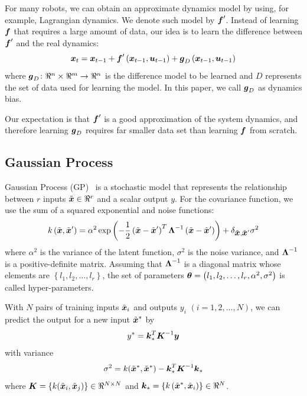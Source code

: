 For many robots, we can obtain an approximate dynamics model by using,
for example, Lagrangian dynamics.
We denote such model by $\mbox{\boldmath \(f\)}'$.
Instead of learning $\mbox{\boldmath \(f\)}$ that requires a large amount of data,
our idea is to learn the difference between $\mbox{\boldmath \(f\)}'$ and the real
dynamics:
\begin{equation}
\mbox{\boldmath \(x\)}_t = \mbox{\boldmath \(x\)}_{t-1} + \mbox{\boldmath \(f\)}'\left(\mbox{\boldmath \(x\)}_{t-1},
\mbox{\boldmath \(u\)}_{t-1}\right) +
\mbox{\boldmath \(g\)}_D\left(\mbox{\boldmath \(x\)}_{t-1},\mbox{\boldmath \(u\)}_{t-1}\right)
\end{equation}
where $\mbox{\boldmath \(g\)}_D\colon
\Re^{n}\times\Re^{m}\rightarrow\Re^{n}$ is the difference
model to be learned and $D$ 
represents the set of data used for learning the model.
In this paper, we call $\mbox{\boldmath \(g\)}_D$ as dynamics bias.

Our expectation is that $\mbox{\boldmath \(f\)}'$ is a good approximation of the system
dynamics, and therefore learning $\mbox{\boldmath \(g\)}_D$ requires far smaller
data set than learning $\mbox{\boldmath \(f\)}$ from scratch.

\subsection{Gaussian Process}


Gaussian Process (GP)~\cite{bib-rasmussen-gp} is a stochastic model that
represents the relationship between $r$ inputs
$\tilde{\mbox{\boldmath \(x\)}}\in \Re^{r}$ and a scalar output $y$.
For the covariance function, we use the sum of a squared exponential
and noise functions:
\begin{equation}
k\left(\tilde{\mbox{\boldmath \(x\)}}, \tilde{\mbox{\boldmath \(x\)}}'\right) = \alpha^2 \exp \left(
-\frac{1}{2} \left(\tilde{\mbox{\boldmath \(x\)}} - \tilde{\mbox{\boldmath \(x\)}}'\right)^T
\mbox{\boldmath \(\Lambda\)}^{-1} \left(\tilde{\mbox{\boldmath \(x\)}} - \tilde{\mbox{\boldmath \(x\)}}'\right)
\right)
+ \delta_{\tilde{\mbox{\boldmath \(x\)}}, \tilde{\mbox{\boldmath \(x\)}}'} \sigma^2
\end{equation}
where $\alpha^2$ is the variance of the latent function, $\sigma^2$ is
the noise variance, and $\mbox{\boldmath \(\Lambda\)}^{-1}$ is a positive-definite
matrix. 
Assuming that $\mbox{\boldmath \(\Lambda\)}^{-1}$ is a diagonal matrix whose
elements are $\left\{l_1, l_2, \ldots, l_r\right\}$, the set of
parameters $\mbox{\boldmath \(\theta\)} =
\left(l_1,l_2,\ldots,l_r,\alpha^2,\sigma^2\right)$ is called
hyper-parameters. 

With $N$ pairs of training inputs $\tilde{\mbox{\boldmath \(x\)}}_i$ and outputs
$y_i$ $(i=1,2,\ldots,N)$, we can predict the output for a new
input $\tilde{\mbox{\boldmath \(x\)}}^*$ by
\begin{equation}
y^* = \mbox{\boldmath \(k\)}_*^T \mbox{\boldmath \(K\)}^{-1} \mbox{\boldmath \(y\)}
\end{equation}
with variance
\begin{equation}
\sigma^2 = k(\tilde{\mbox{\boldmath \(x\)}}^*, \tilde{\mbox{\boldmath \(x\)}}^*) -
\mbox{\boldmath \(k\)}_*^{T} \mbox{\boldmath \(K\)}^{-1} \mbox{\boldmath \(k\)}_*
\end{equation}
where $\mbox{\boldmath \(K\)} = \left\{ k(\tilde{\mbox{\boldmath \(x\)}}_i,
\tilde{\mbox{\boldmath \(x\)}}_j)\right\} \in\Re^{N\times N}$ and 
$\mbox{\boldmath \(k\)}_* = \left\{
k\left(\tilde{\mbox{\boldmath \(x\)}}^*,\tilde{\mbox{\boldmath \(x\)}}_i\right)\right\} 
\in \Re^{N}$.

